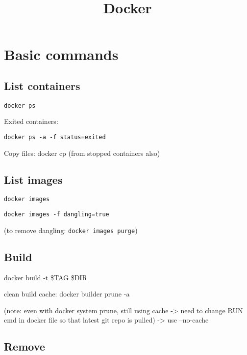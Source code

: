 


\title{Docker}


\date{}


\maketitle

\justify

\renewcommand{\abstractname}{}

\begin{abstract}

\end{abstract}



\section*{Basic commands}

\subsection*{List containers}

\texttt{docker ps}

Exited containers: 

\texttt{docker ps -a -f status=exited}

Copy files: docker cp
(from stopped containers also)


\subsection*{List images}

\texttt{docker images}

\texttt{docker images -f dangling=true}

(to remove dangling: \texttt{docker images purge})


\subsection*{Build}

docker build -t \$TAG \$DIR

clean build cache: docker builder prune -a

(note: even with docker system prune, still using cache -> need to change RUN cmd in docker file so that latest git repo is pulled)
-> use --no-cache


\subsection*{Remove}


